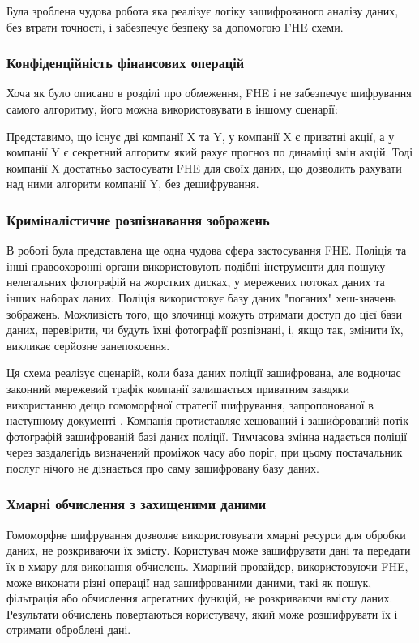 Була зроблена чудова робота \cite{zhiqiang2005} яка реалізує логіку зашифрованого аналізу
даних, без втрати точності, і забезпечує безпеку за допомогою FHE схеми.

\subsubsection*{Конфіденційність фінансових операцій}
Хоча як було описано в розділі про обмеження, FHE і не забезпечує шифрування самого алгоритму,
його можна використовувати в іншому сценарії:

Представимо, що існує дві компанії X та Y, у компанії X є приватні акції, а у компанії Y є
секретний алгоритм який рахує прогноз по динаміці змін акцій. Тоді компанії X достатньо 
застосувати FHE для своїх даних, що дозволить рахувати над ними алгоритм компанії Y, без
дешифрування.

\subsubsection*{Криміналістичне розпізнавання зображень}
В роботі \cite{bosch2014} була представлена ще одна чудова сфера застосування FHE. 
Поліція та інші правоохоронні органи використовують подібні інструменти для пошуку нелегальних
фотографій на жорстких дисках, у мережевих потоках даних та інших наборах даних. Поліція
використовує базу даних "поганих" хеш-значень зображень. Можливість того, що злочинці можуть
отримати доступ до цієї бази даних, перевірити, чи будуть їхні фотографії розпізнані, і, якщо
так, змінити їх, викликає серйозне занепокоєння.

Ця схема реалізує сценарій, коли база даних поліції зашифрована, але водночас законний
мережевий трафік компанії залишається приватним завдяки використанню дещо гомоморфної
стратегії шифрування, запропонованої в наступному документі 
\cite{10.1007/978-3-642-22792-9_29}. Компанія протиставляє хешований і зашифрований потік
фотографій зашифрованій базі даних поліції. Тимчасова змінна надається поліції через
заздалегідь визначений проміжок часу або поріг, при цьому постачальник послуг нічого не
дізнається про саму зашифровану базу даних.

\subsubsection*{Хмарні обчислення з захищеними даними}
Гомоморфне шифрування дозволяє використовувати хмарні ресурси для обробки даних, не
розкриваючи їх змісту. Користувач може зашифрувати дані та передати їх в хмару для
виконання обчислень. Хмарний провайдер, використовуючи FHE, може виконати різні операції
над зашифрованими даними, такі як пошук, фільтрація або обчислення агрегатних функцій, не
розкриваючи вмісту даних. Результати обчислень повертаються користувачу, який може
розшифрувати їх і отримати оброблені дані.

